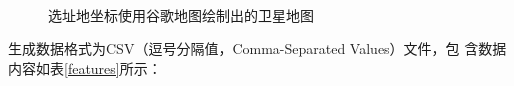 \documentclass[AutoFakeBold]{LZUThesis}
\begin{document}
\begin{figure}[H]
    \centering
	 \\
    \caption{选址地坐标使用谷歌地图绘制出的卫星地图}
    \label{fig_google_maps}
\end{figure}

生成数据格式为CSV（逗号分隔值，Comma-Separated Values）文件，包
含数据内容如表\ref{features}所示：
\end{document}
